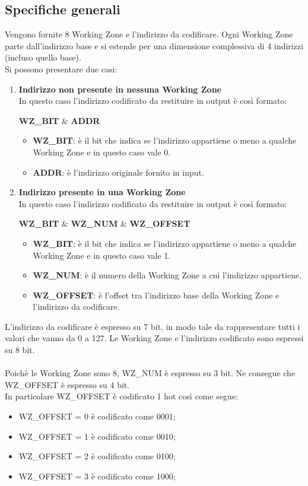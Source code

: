 \documentclass{article}
\begin{document}
\subsection{Specifiche generali}
Vengono fornite 8 Working Zone e l'indirizzo da codificare. Ogni Working Zone parte dall'indirizzo base e si estende per una dimensione complessiva di 4 indirizzi (incluso quello base).\\Si possono presentare due casi:
\begin{enumerate}
\item\textbf{Indirizzo non presente in nessuna Working Zone}\\
In questo caso l'indirizzo codificato da restituire in output è così formato:
\begin{center}
\textbf{WZ\_BIT} \& \textbf{ADDR}
\end{center}
\begin{itemize}
\item\textbf{WZ\_BIT}: è il bit che indica se l'indirizzo appartiene o meno a qualche Working Zone e in questo caso vale 0.
\item\textbf{ADDR}: è l'indirizzo originale fornito in input.
\end{itemize}
\item\textbf{Indirizzo presente in una Working Zone}\\
In questo caso l'indirizzo codificato da restituire in output è così formato:
\begin{center}
\textbf{WZ\_BIT} \& \textbf{WZ\_NUM} \& \textbf{WZ\_OFFSET}
\end{center}
\begin{itemize}
\item\textbf{WZ\_BIT}: è il bit che indica se l'indirizzo appartiene o meno a qualche Working Zone e in questo caso vale 1.
\item\textbf{WZ\_NUM}: è il numero della Working Zone a cui l'indirizzo appartiene.
\item\textbf{WZ\_OFFSET}: è l'offset tra l'indirizzo base della Working Zone e l'indirizzo da codificare.
\end{itemize}
\end{enumerate}
L'indirizzo da codificare è espresso su 7 bit, in modo tale da rappresentare tutti i valori che vanno da 0 a 127. Le Working Zone e l'indirizzo codificato sono espressi su 8 bit.\\\\
Poichè le Working Zone sono 8, WZ\_NUM è espresso su 3 bit. Ne consegue che WZ\_OFFSET è espresso su 4 bit.\\
In particolare WZ\_OFFSET è codificato 1 hot così come segue:
\begin{itemize}
\item WZ\_OFFSET = 0 è codificato come 0001;
\item WZ\_OFFSET = 1 è codificato come 0010;
\item WZ\_OFFSET = 2 è codificato come 0100;
\item WZ\_OFFSET = 3 è codificato come 1000;
\end{itemize}
\pagebreak
\end{document}
